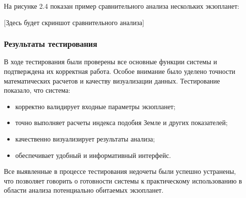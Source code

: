 На рисунке 2.4 показан пример сравнительного анализа нескольких экзопланет:

[Здесь будет скриншот сравнительного анализа]

\subsubsection{Результаты тестирования}

В ходе тестирования были проверены все основные функции системы и подтверждена их корректная работа. Особое внимание было уделено точности математических расчетов и качеству визуализации данных. Тестирование показало, что система:

\begin{itemize}
    \item корректно валидирует входные параметры экзопланет;
    \item точно выполняет расчеты индекса подобия Земле и других показателей;
    \item качественно визуализирует результаты анализа;
    \item обеспечивает удобный и информативный интерфейс.
\end{itemize}

Все выявленные в процессе тестирования недочеты были успешно устранены, что позволяет говорить о готовности системы к практическому использованию в области анализа потенциально обитаемых экзопланет. 